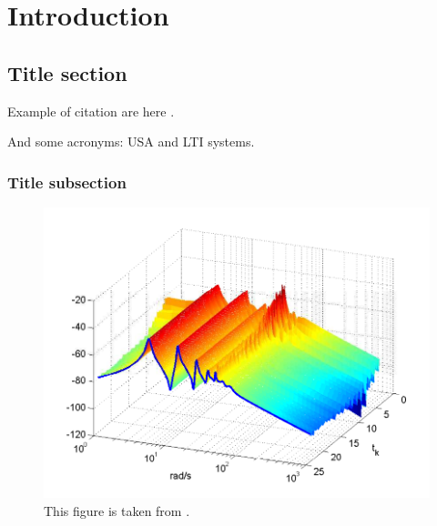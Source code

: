 \doublespacing %

\chapter{Introduction}
\label{ch1}

\begin{spacing}{1} %
\minitoc %
\end{spacing} %
\thesisspacing %


\section{Title section}

\kant[1]

Example of citation are here
\cite{AdaAroKre:71,PadScaAst:16a,PadScaAst:16b,PavVdWNij:06,PurBorVar:96,SLICOT,Sca:16,Sca:16a,Sca:16b,Sca:17,Sca:18}.

And some acronyms: \ac{USA} and \ac{LTI} systems.

\subsection{Title subsection}

\kant[1-10]


\begin{figure}
\centering
\includegraphics[width=0.8\columnwidth]{imgs/buildmagnitude.pdf}
\caption[Short description for list of figures]{This figure is taken from \cite{Sca:16}.}
\label{fig-magnitude}
\end{figure}%


